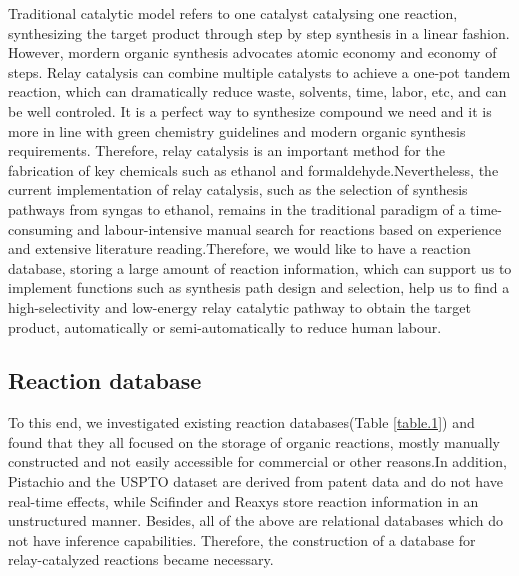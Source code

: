 \documentclass[%
 aip,
 jmp,%
 amsmath,amssymb,
 reprint,%
]{revtex4-2}
\begin{document}
Traditional catalytic model refers to one catalyst catalysing one reaction, 
synthesizing the target product through step by step synthesis in a linear fashion.
However, mordern organic synthesis advocates atomic economy and economy of steps.
Relay catalysis can combine multiple catalysts to achieve a one-pot tandem reaction,
which can dramatically reduce waste, solvents, time, labor, etc, and can be well controled. 
It is a perfect way to synthesize compound we need and it is more in line with green 
chemistry guidelines and modern organic synthesis requirements. Therefore, 
relay catalysis is an important method for the fabrication of key chemicals
such as ethanol and formaldehyde.Nevertheless, the current implementation of 
relay catalysis, such as the selection of synthesis pathways from syngas to ethanol, 
remains in the traditional paradigm of a time-consuming and labour-intensive manual 
search for reactions based on experience and extensive literature reading.Therefore, 
we would like to have a reaction database, storing a large amount of reaction information, 
which can support us to implement functions such as synthesis path design and selection, 
help us to find a high-selectivity and low-energy relay catalytic pathway to obtain the target product, 
automatically or semi-automatically to reduce human labour.

\subsection{Reaction database}
To this end, we investigated existing reaction databases(Table \ref{table.1}) and found that they 
all focused on the storage of organic reactions, mostly manually constructed and not easily
accessible for commercial or other reasons.In addition, Pistachio and the USPTO dataset are derived from patent data 
and do not have real-time effects, while Scifinder and Reaxys store reaction information in 
an unstructured manner. Besides, all of the above are relational databases which do not have inference capabilities.
Therefore, the construction of a database for relay-catalyzed reactions became necessary.
\end{document}
